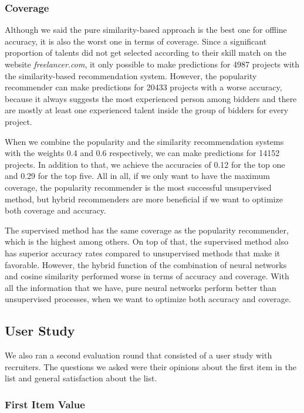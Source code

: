 \subsubsection{Coverage}

Although we said the pure similarity-based approach is the best one for offline accuracy, it is also the worst one in terms of coverage. Since a significant proportion of talents did not get selected according to their skill match on the website \textit{freelancer.com}, it only possible to make predictions for 4987 projects with the similarity-based recommendation system. However, the popularity recommender can make predictions for 20433 projects with a worse accuracy, because it always suggests the most experienced person among bidders and there are mostly at least one experienced talent inside the group of bidders for every project.

When we combine the popularity and the similarity recommendation systems with the weights 0.4 and 0.6 respectively, we can make predictions for 14152 projects. In addition to that,  we achieve the accuracies of 0.12 for the top one and 0.29 for the top five. All in all, if we only want to have the maximum coverage, the popularity recommender is the most successful unsupervised method, but hybrid recommenders are more beneficial if we want to optimize both coverage and accuracy.

The supervised method has the same coverage as the popularity recommender, which is the highest among others. On top of that, the supervised method also has superior accuracy rates compared to unsupervised methods that make it favorable. However, the hybrid function of the combination of neural networks and cosine similarity performed worse in terms of accuracy and coverage. With all the information that we have, pure neural networks perform better than unsupervised processes, when we want to optimize both accuracy and coverage.

\subsection{User Study}

We also ran a second evaluation round that consisted of a user study with recruiters. The questions we asked were their opinions about the first item in the list and general satisfaction about the list.

\subsubsection{First Item Value}

